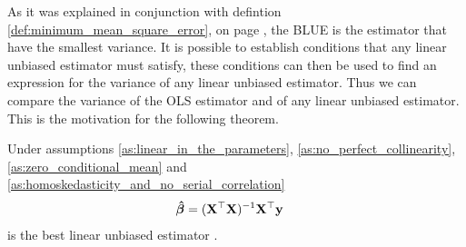 As it was explained in conjunction with defintion \ref{def:minimum_mean_square_error}, on page \pageref{def:minimum_mean_square_error}, the BLUE is the estimator that have the smallest variance.
It is possible to establish conditions that any linear unbiased estimator must satisfy, these conditions can then be used to find an expression for the variance of any linear unbiased estimator.
Thus we can compare the variance of the OLS estimator and of any linear unbiased estimator.
This is the motivation for the following theorem.
\begin{theorem}
    Under assumptions \ref{as:linear_in_the_parameters}, \ref{as:no_perfect_collinearity}, \ref{as:zero_conditional_mean} and \ref{as:homoskedasticity_and_no_serial_correlation} 
    \begin{align*}
        \operatorname{\boldsymbol{\hat{\beta}}} &= (\mathbf{X}^\top\mathbf{X})^{-1}\mathbf{X}^\top\mathbf{y}
    \end{align*}
    is the best linear unbiased estimator \cite[p. 811]{Wooldridge2012}.
\end{theorem}\label{th:gauss_markoc_theorem}
